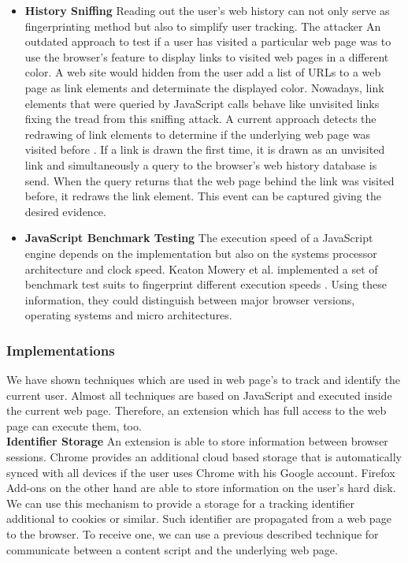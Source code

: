 \begin{itemize}
				\item \textbf{History Sniffing} Reading out the user's web history can not only serve as fingerprinting method but also to simplify user tracking. The attacker  An outdated approach to test if a user has visited a particular web page was to use the browser's feature to display links to visited web pages in a different color. A web site would hidden from the user add a list of URLs to a web page as link elements and determinate the displayed color. Nowadays, link elements that were queried by JavaScript calls behave like unvisited links fixing the tread from this sniffing attack. A current approach detects the redrawing of link elements to determine if the underlying web page was visited before \cite{paulstone_historysniffing}. If a link is drawn the first time, it is drawn as an unvisited link and simultaneously a query to the browser's web history database is send. When the query returns that the web page behind the link was visited before, it redraws the link element. This event can be captured giving the desired evidence.
				
				\item \textbf{JavaScript Benchmark Testing} The execution speed of a JavaScript engine depends on the implementation but also on the systems processor architecture and clock speed. Keaton Mowery et al. implemented a set of benchmark test suits to fingerprint different execution speeds \cite{MBYS11}. Using these information, they could distinguish between major browser versions, operating systems and micro architectures. 
			\end{itemize}
		
		\subsubsection{Implementations}
			
			We have shown techniques which are used in web page's to track and identify the current user. Almost all techniques are based on JavaScript and executed inside the current web page. Therefore, an extension which has full access to the web page can execute them, too. \\
			
			\textbf{Identifier Storage} An extension is able to store information between browser sessions. Chrome provides an additional cloud based storage that is automatically synced with all devices if the user uses Chrome with his Google account. Firefox Add-ons on the other hand are able to store information on the user's hard disk. We can use this mechanism to provide a storage for a tracking identifier additional to cookies or similar. Such identifier are propagated from a web page to the browser. To receive one, we can use a previous described technique for communicate between a content script and the underlying web page. \\
			
